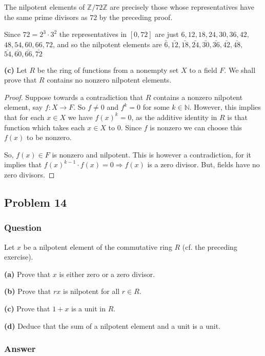 \documentclass[12pt]{article}
\begin{document}
The nilpotent elements of $\mathbb{Z} / 72\mathbb{Z}$  are precisely those whose representatives have the same prime divisors as $72$ by the preceding proof. 

Since $72=2^3 \cdot 3^2$ the representatives in $[0,72]$ are just $6, 12, 18, 24, 30, 36, 42,$ $48, 54, 60, 66, 72$, and so the nilpotent elements are $\bar{6}, \bar{12}, \bar{18}, \bar{24}, \bar{30}, \bar{36}, \bar{42}, \bar{48},$ $\bar{54}, \bar{60}, \bar{66}, \bar{72}$

\textbf{(c)} Let $R$ be the ring of functions from a nonempty set $X$ to a field $F$. We shall prove that $R$ contains no nonzero nilpotent elements.

\begin{proof} Suppose towards a contradiction that $R$ contains a nonzero nilpotent element, say $f: X \to F$. So $f\neq0$ and $f^k=0$ for some $k\in \mathbb{N}$. However, this implies that for each $x \in X$ we have $f(x)^k=0$, as the additive identity in $R$ is that function which takes each $x\in X$ to $0$. Since $f$ is nonzero we can choose this $f(x)$ to be nonzero.

So, $f(x) \in F$ is nonzero and nilpotent. This is however a contradiction, for it implies that $f(x)^{k-1}\cdot f(x)= 0 \Rightarrow f(x)$ is a zero divisor. But, fields have no zero divisors.
\end{proof}

\subsection{Problem 14}

\subsubsection{Question}
Let $x$ be a nilpotent element of the commutative ring $R$ (cf. the preceding exercise).

\textbf{(a)} Prove that $x$ is either zero or a zero divisor.

\textbf{(b)} Prove that $rx$ is nilpotent for all $r \in R$. 

\textbf{(c)} Prove that $1+x$ is a unit in $R$.

\textbf{(d)} Deduce that the sum of a nilpotent element and a unit is a unit.


\subsubsection{Answer}
\end{document}
